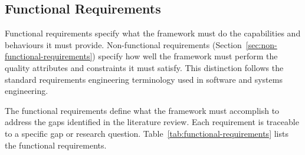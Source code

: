\subsection{Functional Requirements}\label{sec:functional-requirements}

Functional requirements specify what the framework must do the capabilities and behaviours it must provide. Non-functional requirements (Section~\ref{sec:non-functional-requirements}) specify how well the framework must perform the quality attributes and constraints it must satisfy. This distinction follows the standard requirements engineering terminology used in software and systems engineering.

The functional requirements define what the framework must accomplish to address the gaps identified in the literature review. Each requirement is traceable to a specific gap or research question. Table~\ref{tab:functional-requirements} lists the functional requirements.

